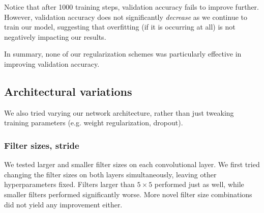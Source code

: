 \documentclass{article}
\begin{document}
\begin{multicols}{2}
Notice that after 1000 training steps,
validation accuracy fails to improve further.
However, validation accuracy
does not significantly \emph{decrease}
as we continue to train our model,
suggesting that overfitting (if it is occurring at all)
is not negatively impacting our results.

In summary, none of our regularization schemes
was particularly effective in improving validation accuracy.



\subsection{Architectural variations}

We also tried varying our network architecture,
rather than just tweaking training parameters
(e.g. weight regularization, dropout).


\subsubsection{Filter sizes, stride}

We tested larger and smaller filter sizes
on each convolutional layer.
We first tried changing the filter sizes on both layers simultaneously,
leaving other hyperparameters fixed.
Filters larger than $5\times 5$ performed just as well,
while smaller filters performed significantly worse.
More novel filter size combinations
did not yield any improvement either.

%


\end{multicols}
\end{document}
